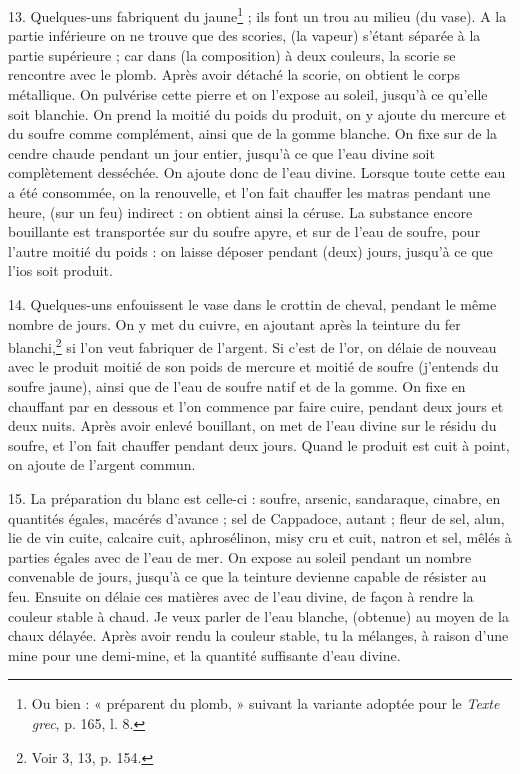 \documentclass[landscape, a4paper, 11pt, oneside, polutonikogreek, french]{article}
\begin{document}
13. Quelques-uns fabriquent du jaune\footnote{Ou bien : « préparent du plomb, » suivant la variante adoptée pour le \emph{Texte grec}, p. 165, l. 8.} ; ils font un trou au milieu (du vase). A la partie inférieure on ne trouve que des scories, (la vapeur) s'étant séparée à la partie supérieure ; car dans (la composition) à deux couleurs, la scorie se rencontre avec le plomb. Après avoir détaché la scorie, on obtient le corps métallique. On pulvérise cette pierre et on l'expose au soleil, jusqu'à ce qu'elle soit blanchie. On prend la moitié du poids du produit, on y ajoute du mercure et du soufre comme complément, ainsi que de la gomme blanche. On fixe sur de la cendre chaude pendant un jour entier, jusqu'à ce que l'eau divine soit complètement desséchée. On ajoute donc de l'eau divine. Lorsque toute cette eau a été consommée, on la renouvelle, et l'on fait chauffer les matras pendant une heure, (sur un feu) indirect : on obtient ainsi la céruse. La substance encore bouillante est transportée sur du soufre apyre, et sur de l'eau de soufre, pour l'autre moitié du poids : on laisse déposer pendant (deux) jours, jusqu'à ce que l'ios soit produit.

14. Quelques-uns enfouissent le vase dans le crottin de cheval, pendant le même nombre de jours. On y met du cuivre, en ajoutant après la teinture du fer blanchi,\footnote{Voir 3, 13, p. 154.} si l'on veut fabriquer de l'argent. Si c'est de l'or, on délaie de nouveau avec le produit moitié de son poids de mercure et moitié de soufre (j'entends du soufre jaune), ainsi que de l'eau de soufre natif et de la gomme. On fixe en chauffant par en dessous et l'on commence par faire cuire, pendant deux jours et deux nuits. Après avoir enlevé bouillant, on met de l'eau divine sur le résidu du soufre, et l'on fait chauffer pendant deux jours. Quand le produit est cuit à point, on ajoute de l'argent commun.

15. La préparation du blanc est celle-ci : soufre, arsenic, sandaraque, cinabre, en quantités égales, macérés d'avance ; sel de Cappadoce, autant ; fleur de sel, alun, lie de vin cuite, calcaire cuit, aphrosélinon, misy cru et cuit, natron et sel, mêlés à parties égales avec de l'eau de mer. On expose au soleil pendant un nombre convenable de jours, jusqu'à ce que la teinture devienne capable de résister au feu. Ensuite on délaie ces matières avec de l'eau divine, de façon à rendre la couleur stable à chaud. Je veux parler de l'eau blanche, (obtenue) au moyen de la chaux délayée. Après avoir rendu la couleur stable, tu la mélanges, à raison d'une mine pour une demi-mine, et la quantité suffisante d'eau divine.
\end{document}
